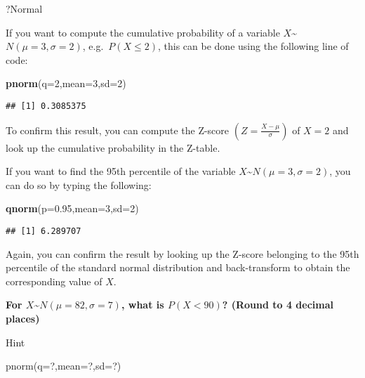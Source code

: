 \documentclass[
]{book}
\newenvironment{Shaded}{\begin{snugshade}}{\end{snugshade}}
\newcommand{\AttributeTok}[1]{\textcolor[rgb]{0.13,0.29,0.53}{#1}}
\newcommand{\DecValTok}[1]{\textcolor[rgb]{0.00,0.00,0.81}{#1}}
\newcommand{\FloatTok}[1]{\textcolor[rgb]{0.00,0.00,0.81}{#1}}
\newcommand{\FunctionTok}[1]{\textcolor[rgb]{0.13,0.29,0.53}{\textbf{#1}}}
\newcommand{\NormalTok}[1]{#1}
\begin{document}
\begin{Shaded}
\begin{Highlighting}[]
\NormalTok{?Normal}
\end{Highlighting}
\end{Shaded}

If you want to compute the cumulative probability of a variable \(X\)\textasciitilde{}\(N(\mu=3,\sigma=2)\), e.g.~\(P(X \leq 2)\), this can be done using the following line of code:

\begin{Shaded}
\begin{Highlighting}[]
\FunctionTok{pnorm}\NormalTok{(}\AttributeTok{q=}\DecValTok{2}\NormalTok{,}\AttributeTok{mean=}\DecValTok{3}\NormalTok{,}\AttributeTok{sd=}\DecValTok{2}\NormalTok{)}
\end{Highlighting}
\end{Shaded}

\begin{verbatim}
## [1] 0.3085375
\end{verbatim}

To confirm this result, you can compute the Z-score \(\left(Z=\frac{X-\mu}{\sigma}\right)\) of \(X=2\) and look up the cumulative probability in the Z-table.

If you want to find the 95th percentile of the variable \(X\)\textasciitilde{}\(N(\mu=3,\sigma=2)\), you can do so by typing the following:

\begin{Shaded}
\begin{Highlighting}[]
\FunctionTok{qnorm}\NormalTok{(}\AttributeTok{p=}\FloatTok{0.95}\NormalTok{,}\AttributeTok{mean=}\DecValTok{3}\NormalTok{,}\AttributeTok{sd=}\DecValTok{2}\NormalTok{)}
\end{Highlighting}
\end{Shaded}

\begin{verbatim}
## [1] 6.289707
\end{verbatim}

Again, you can confirm the result by looking up the Z-score belonging to the 95th percentile of the standard normal distribution and back-transform to obtain the corresponding value of \(X\).

\textbf{For \(X\)\textasciitilde{}\(N(\mu=82,\sigma=7)\), what is \(P(X<90)\)? (Round to 4 decimal places)}

Hint

pnorm(q=?,mean=?,sd=?)
\end{document}
